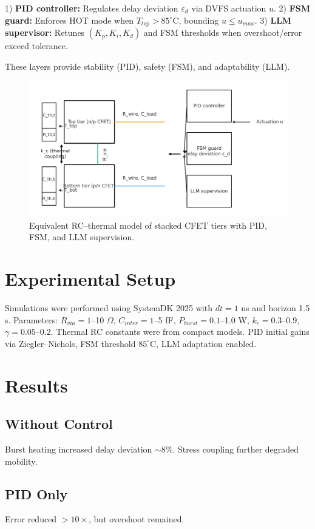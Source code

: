 \documentclass[conference]{IEEEtran}
\begin{document}
1) \textbf{PID controller:} Regulates delay deviation $\varepsilon_d$ via DVFS actuation $u$.  
2) \textbf{FSM guard:} Enforces HOT mode when $T_{top}>85^\circ$C, bounding $u \leq u_{max}$.  
3) \textbf{LLM supervisor:} Retunes $(K_p,K_i,K_d)$ and FSM thresholds when overshoot/error exceed tolerance.  

These layers provide stability (PID), safety (FSM), and adaptability (LLM).

\begin{figure}[h]
\centering
\includegraphics[width=0.9\columnwidth]{figs/fig1_cfet_rc_thermal_equiv.png}
\caption{Equivalent RC--thermal model of stacked CFET tiers with PID, FSM, and LLM supervision.}
\label{fig:model}
\end{figure}

\section{Experimental Setup}
Simulations were performed using SystemDK 2025 with $dt=1$ ns and horizon 1.5 s. Parameters:  
$R_{via}=1$--10 $\Omega$, $C_{inter}=1$--5 fF, $P_{burst}=0.1$--1.0 W, $k_c=0.3$--0.9, $\gamma=0.05$--0.2.  
Thermal RC constants were from compact models. PID initial gains via Ziegler–Nichols, FSM threshold $85^\circ$C, LLM adaptation enabled.

\section{Results}
\subsection{Without Control}
Burst heating increased delay deviation $\sim$8\%. Stress coupling further degraded mobility.  

\subsection{PID Only}
Error reduced $>10\times$, but overshoot remained.  
\end{document}
